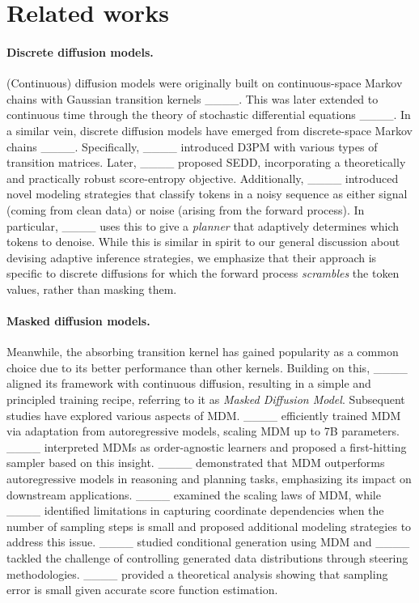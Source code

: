 \section{Related works}
\paragraph{Discrete diffusion models.}
(Continuous) diffusion models were originally built on continuous-space Markov chains with Gaussian transition kernels ____. This was later extended to continuous time through the theory of stochastic differential equations ____. In a similar vein, discrete diffusion models have emerged from discrete-space Markov chains ____. Specifically, ____ introduced D3PM with various types of transition matrices. Later, ____ proposed SEDD, incorporating a theoretically and practically robust score-entropy objective. Additionally, ____ introduced novel modeling strategies that classify tokens in a noisy sequence as either signal (coming from clean data) or noise (arising from the forward process). In particular, ____ uses this to give a \emph{planner} that adaptively determines which tokens to denoise. While this is similar in spirit to our general discussion about devising adaptive inference strategies, we emphasize that their approach is specific to discrete diffusions for which the forward process \emph{scrambles} the token values, rather than masking them.

\paragraph{Masked diffusion models.} Meanwhile, the absorbing transition kernel has gained popularity as a common choice due to its better performance than other kernels. Building on this, ____ aligned its framework with continuous diffusion, resulting in a simple and principled training recipe, referring to it as \emph{Masked Diffusion Model}. Subsequent studies have explored various aspects of MDM. ____ efficiently trained MDM via adaptation from autoregressive models, scaling MDM up to 7B parameters. ____ interpreted 
MDMs as order-agnostic learners and proposed a first-hitting sampler based on this insight. ____ demonstrated that MDM outperforms autoregressive models in reasoning and planning tasks, emphasizing its impact on downstream applications. ____ examined the scaling laws of MDM, while ____ identified limitations in capturing coordinate dependencies when the number of sampling steps is small and proposed additional modeling strategies to address this issue. ____ studied conditional generation using MDM and ____ tackled the challenge of controlling generated data distributions through steering methodologies. ____ provided a theoretical analysis showing that sampling error is small given accurate score function estimation.


